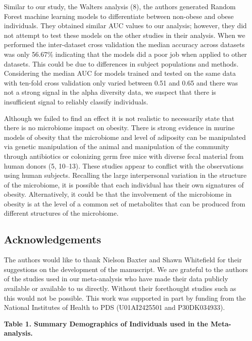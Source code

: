\documentclass[12pt,]{article}
\begin{document}
Similar to our study, the Walters analysis (8), the authors generated
Random Forest machine learning models to differentiate between non-obese
and obese individuals. They obtained similar AUC values to our analysis;
however, they did not attempt to test these models on the other studies
in their analysis. When we performed the inter-dataset cross validation
the median accuracy across datasets was only 56.67\% indicating that the
models did a poor job when applied to other datasets. This could be due
to differences in subject populations and methods. Considering the
median AUC for models trained and tested on the same data with ten-fold
cross validation only varied between 0.51 and 0.65 and there was not a
strong signal in the alpha diversity data, we suspect that there is
insufficient signal to reliably classify individuals.

Although we failed to find an effect it is not realistic to necessarily
state that there is no microbiome impact on obesity. There is strong
evidence in murine models of obesity that the microbiome and level of
adiposity can be manipulated via genetic manipulation of the animal and
manipulation of the community through antibiotics or colonizing germ
free mice with diverse fecal material from human donors (5, 10--13).
These studies appear to conflict with the observations using human
subjects. Recalling the large interpersonal variation in the structure
of the microbiome, it is possible that each individual has their own
signatures of obesity. Alternatively, it could be that the involvement
of the microbiome in obesity is at the level of a common set of
metabolites that can be produced from different structures of the
microbiome.

\subsection{Acknowledgements}\label{acknowledgements}

The authors would like to thank Nielson Baxter and Shawn Whitefield for
their suggestions on the development of the manuscript. We are grateful
to the authors of the studies used in our meta-analysis who have made
their data publicly available or available to us directly. Without their
forethought studies such as this would not be possible. This work was
supported in part by funding from the National Institutes of Health to
PDS (U01AI2425501 and P30DK034933).

\newpage

\textbf{Table 1. Summary Demographics of Individuals used in the
Meta-analysis.}
\end{document}
